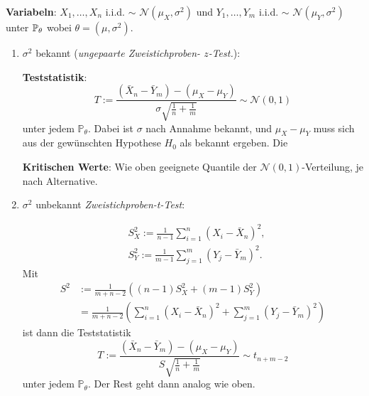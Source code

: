 \textbf{Variabeln}: $X_1, \ldots , X_n$ i.i.d. $\sim$ $\mathcal{N}(\mu_X, \sigma^2)$ und $Y_1, \ldots , Y_m$ i.i.d. $\sim$ $\mathcal{N}(\mu_Y, \sigma^2)$ unter $\mathbb{P}_\theta$ wobei $\theta = (\mu, \sigma^2)$.
\begin{enumerate}
    \item $\sigma^{2}$ bekannt (\textit{ungepaarte Zweistichproben- $z$-Test.}): 

    \textbf{Teststatistik}:
    $$
    T:=\frac{\left(\bar{X}_{n}-\bar{Y}_{m}\right)-\left(\mu_{X}-\mu_{Y}\right)}{\sigma \sqrt{\frac{1}{n}+\frac{1}{m}}} \sim \mathcal{N}(0,1)
    $$
    unter jedem $\mathbb{P}_{\theta}$. Dabei ist $\sigma$ nach Annahme bekannt, und $\mu_{X}-\mu_{Y}$ muss sich aus der gewünschten Hypothese $H_{0}$ als bekannt ergeben. Die 
    
    \textbf{Kritischen Werte}: Wie oben geeignete Quantile der $\mathcal{N}(0,1)$-Verteilung, je nach Alternative. 
    \item $\sigma^{2}$ unbekannt \textit{Zweistichproben-t-Test}:
    
    $$
    \begin{aligned}
    &S_{X}^{2}:=\frac{1}{n-1} \sum_{i=1}^{n}\left(X_{i}-\bar{X}_{n}\right)^{2}, \\
    &S_{Y}^{2}:=\frac{1}{m-1} \sum_{j=1}^{m}\left(Y_{j}-\bar{Y}_{m}\right)^{2} .
    \end{aligned}
    $$
    Mit
    $$
    \begin{aligned}
    S^{2} &:=\frac{1}{m+n-2}\left((n-1) S_{X}^{2}+(m-1) S_{Y}^{2}\right) \\
    &=\frac{1}{m+n-2}\left(\sum_{i=1}^{n}\left(X_{i}-\bar{X}_{n}\right)^{2}+\sum_{j=1}^{m}\left(Y_{j}-\bar{Y}_{m}\right)^{2}\right)
    \end{aligned}
    $$
    ist dann die Teststatistik
    $$
    T:=\frac{\left(\bar{X}_{n}-\bar{Y}_{m}\right)-\left(\mu_{X}-\mu_{Y}\right)}{S \sqrt{\frac{1}{n}+\frac{1}{m}}} \sim t_{n+m-2}
    $$
    unter jedem $\mathbb{P}_{\theta}$. Der Rest geht dann analog wie oben.
\end{enumerate}